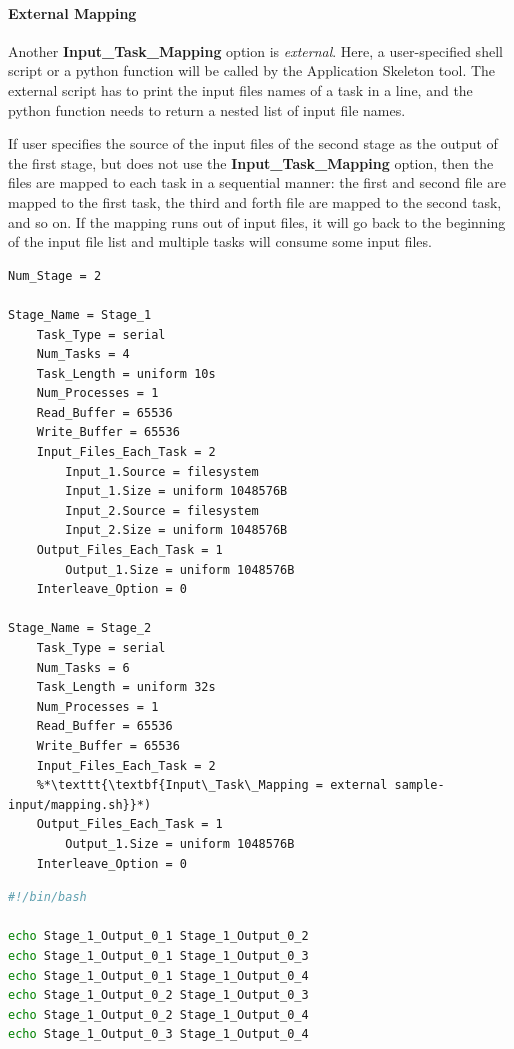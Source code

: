 \documentclass[10pt,a4paper]{article}
\begin{document}
\paragraph{External Mapping}
Another \textbf{Input\_Task\_Mapping} option is {\it external}. Here, a user-specified
shell script or a python function will be called by the Application Skeleton tool. The external script
has to print the input files names of a task in a line, and the python function needs to return a nested
list of input file names.

If user specifies the source of the input files of the second stage as the output of the first stage,
but does not use the \textbf{Input\_Task\_Mapping} option, then the files are mapped to each task in a sequential
manner: the first and second file are mapped to the first task, the third and forth file are mapped
to the second task, and so on. If the mapping runs out of input files, it will go back to the beginning
of the input file list and multiple tasks will consume some input files.



\begin{lstlisting}[caption=Use case for external mapper, label=lst:exmapper, linewidth=1.0\textwidth, xleftmargin=2.5ex]
Num_Stage = 2

Stage_Name = Stage_1
    Task_Type = serial
    Num_Tasks = 4
    Task_Length = uniform 10s
    Num_Processes = 1
    Read_Buffer = 65536
    Write_Buffer = 65536
    Input_Files_Each_Task = 2
        Input_1.Source = filesystem
        Input_1.Size = uniform 1048576B
        Input_2.Source = filesystem
        Input_2.Size = uniform 1048576B
    Output_Files_Each_Task = 1
        Output_1.Size = uniform 1048576B
    Interleave_Option = 0

Stage_Name = Stage_2
    Task_Type = serial
    Num_Tasks = 6
    Task_Length = uniform 32s
    Num_Processes = 1
    Read_Buffer = 65536
    Write_Buffer = 65536
    Input_Files_Each_Task = 2
    %*\texttt{\textbf{Input\_Task\_Mapping = external sample-input/mapping.sh}}*)
    Output_Files_Each_Task = 1
        Output_1.Size = uniform 1048576B
    Interleave_Option = 0

\end{lstlisting}

\begin{lstlisting}[language=Bash, caption=Sample code for an external mapper, label=lst:excode, linewidth=1.0\textwidth, xleftmargin=2.5ex]
#!/bin/bash

echo Stage_1_Output_0_1 Stage_1_Output_0_2
echo Stage_1_Output_0_1 Stage_1_Output_0_3
echo Stage_1_Output_0_1 Stage_1_Output_0_4
echo Stage_1_Output_0_2 Stage_1_Output_0_3
echo Stage_1_Output_0_2 Stage_1_Output_0_4
echo Stage_1_Output_0_3 Stage_1_Output_0_4
\end{lstlisting}
\end{document}
